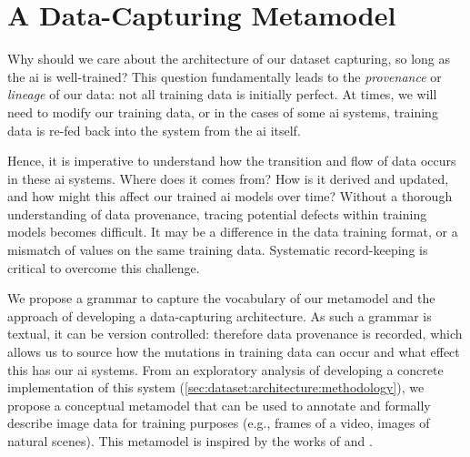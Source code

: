 \section{A Data-Capturing Metamodel}
\label{sec:dataset:architecture}

Why should we care about the architecture of our dataset capturing, so long as the \gls{ai} is well-trained? This question fundamentally leads to the \textit{provenance} or \textit{lineage} of our data: not all training data is initially perfect. At times, we will need to modify our training data, or in the cases of some \gls{ai} systems, training data is re-fed back into the system from the \gls{ai} itself. 

Hence, it is imperative to understand how the transition and flow of data occurs \citep{Cui:2003im,Ikeda:2009ca,Buneman:2000bn} in these \gls{ai} systems. Where does it comes from? How is it derived and updated, and how might this affect our trained \gls{ai} models over time? Without a thorough understanding of data provenance, tracing potential defects within training models becomes difficult. It may be a difference in the data training format, or a mismatch of values on the same training data. Systematic record-keeping is critical to overcome this challenge.

We propose a grammar to capture the vocabulary of our metamodel and the approach of developing a data-capturing architecture. As such a grammar is textual, it can be version controlled: therefore data provenance is recorded, which allows us to source how the mutations in training data can occur and what effect this has our \gls{ai} systems. From an exploratory analysis of developing a concrete implementation of this system (\cref{sec:dataset:architecture:methodology}), we propose a conceptual metamodel that can be used to annotate and formally describe image data for training purposes (e.g., frames of a video, images of natural scenes). This metamodel is inspired by the works of \citet{Wickham:2010hy, Wickham:2007tu} and \citet{Moody:2009vo}.




